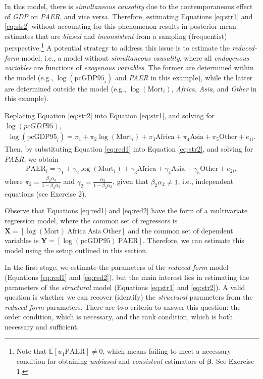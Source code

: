 In this model, there is \textit{simultaneous causality} due to the contemporaneous effect of \textit{GDP} on \textit{PAER}, and vice versa. Therefore, estimating Equations \ref{eq:str1} and \ref{eq:str2} without accounting for this phenomenon results in posterior mean estimates that are \textit{biased} and \textit{inconsistent} from a sampling (frequentist) perspective.\footnote{Note that $\mathbb{E}[u_1\text{PAER}]\neq 0$, which means failing to meet a necessary condition for obtaining \textit{unbiased} and \textit{consistent} estimators of $\bm{\beta}$. See Exercise 1.} A potential strategy to address this issue is to estimate the \textit{reduced-form} model, i.e., a model without \textit{simultaneous causality}, where all \textit{endogenous variables} are functions of \textit{exogenous variables}. The former are determined within the model (e.g., $\log(\text{pcGDP95}_i)$ and \textit{PAER} in this example), while the latter are determined outside the model (e.g., $\log(\text{Mort}_i)$, \textit{Africa}, \textit{Asia}, and \textit{Other} in this example).

Replacing Equation \ref{eq:str2} into Equation \ref{eq:str1}, and solving for $\log(\textit{pcGDP95})$,
\begin{align}\label{eq:red1}
	\log(\text{pcGDP95}_i)=\pi_1+\pi_2\log(\text{Mort}_i)+\pi_3 \text{Africa}+\pi_4 \text{Asia}+\pi_5 \text{Other}+e_{1i}.   
\end{align}
Then, by substituting Equation \ref{eq:red1} into Equation \ref{eq:str2}, and solving for \textit{PAER}, we obtain
\begin{align}\label{eq:red2}
	\text{PAER}_i = \gamma_1 + \gamma_2 \log(\text{Mort}_i) + \gamma_3 \text{Africa} + \gamma_4 \text{Asia} + \gamma_5 \text{Other} + e_{2i},
\end{align}
where $\pi_2 = \frac{\beta_2\alpha_3}{1 - \beta_2\alpha_2}$ and $\gamma_2 = \frac{\alpha_3}{1 - \beta_2\alpha_2}$, given that $\beta_2 \alpha_2 \neq 1$, i.e., independent equations (see Exercise 2).

Observe that Equations \ref{eq:red1} and \ref{eq:red2} have the form of a multivariate regression model, where the common set of regressors is $\bm{X} = \left[\log(\text{Mort}) \ \text{Africa} \ \text{Asia} \ \text{Other}\right]$ and the common set of dependent variables is $\bm{Y} = \left[\log(\text{pcGDP95}) \ \text{PAER}\right]$. Therefore, we can estimate this model using the setup outlined in this section.

In the first stage, we estimate the parameters of the \textit{reduced-form} model (Equations \ref{eq:red1} and \ref{eq:red2}), but the main interest lies in estimating the parameters of the \textit{structural} model (Equations \ref{eq:str1} and \ref{eq:str2}). A valid question is whether we can recover (identify) the \textit{structural} parameters from the \textit{reduced-form} parameters. There are two criteria to answer this question: the order condition, which is necessary, and the rank condition, which is both necessary and sufficient.\\
 
